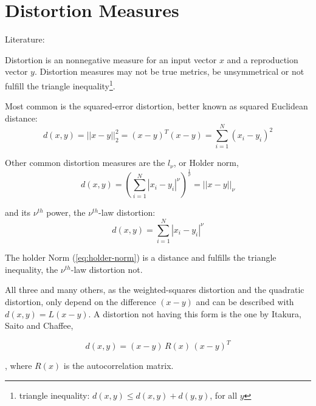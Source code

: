 \section{Distortion Measures}\label{sec:lvq-distortion-measures}
Literature: \cite{Linde1980}

Distortion is an nonnegative measure for an input vector $x$ and a reproduction vector $y$. Distortion measures may not be true metrics, \eg be unsymmetrical or not fulfill the triangle inequality\footnote{triangle inequality: $d(x, y) \leq d(x, y) + d(y, y)$, for all $y$}.

Most common is the squared-error distortion, better known as squared Euclidean distance:
\begin{equation}
d(x, y) = ||x-y||_2^2 = (x-y)^T (x-y) = \sum_{i=1}^N (x_i-y_i)^2
\end{equation}

Other common distortion measures are the $l_\nu$, or Holder norm,
\begin{equation}\label{eq:holder-norm}
d(x, y) = \left( \sum_{i=1}^N |x_i - y_i|^\nu \right) ^{\frac{1}{\nu}} = || x - y ||_\nu
\end{equation}

and its $\nu^{th}$ power, the $\nu^{th}$-law distortion:
\begin{equation}
d(x, y) = \sum_{i=1}^N |x_i - y_i|^\nu
\end{equation}

The holder Norm (\cref{eq:holder-norm}) is a distance and fulfills the triangle inequality, the $\nu^{th}$-law distortion not.

All three and many others, as the weighted-squares distortion and the quadratic distortion, only depend on the difference $(x - y)$ and can be described with $d(x, y) = L(x - y)$. A distortion not having this form is the one by Itakura, Saito and Chaffee,

\begin{equation}
d(x, y) = (x - y)\, R(x)\, (x - y)^T
\end{equation}

, where $R(x)$ is the autocorrelation matrix.
